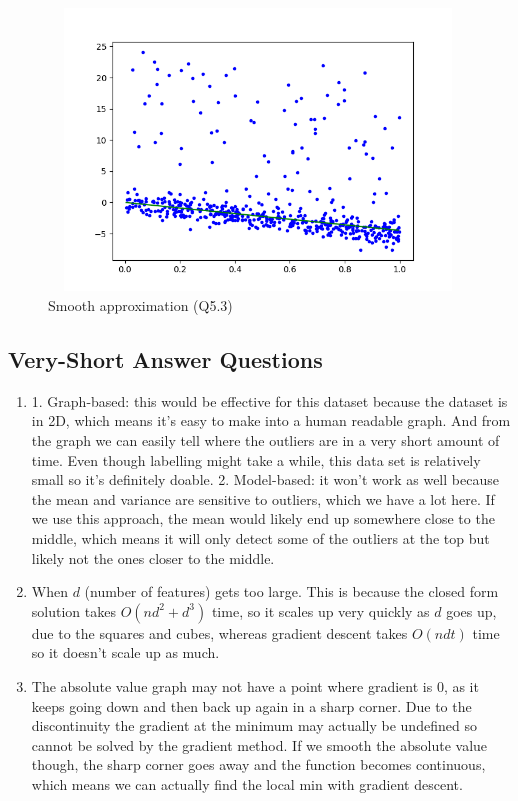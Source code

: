 \documentclass{article}
\def\enum#1{\begin{enumerate}#1\end{enumerate}}
\begin{document}
\begin{figure}[h!]
    \includegraphics[width=30em,height=7.5cm]{a2_q5_3.png}
    \caption{Smooth approximation (Q5.3)}
    \label{fig:q5_3}
  \end{figure}

\subsection{Very-Short Answer Questions}

\enum{
\item 1. Graph-based: this would be effective for this dataset because the dataset is in 2D, which means it's easy to make into a human readable graph. And from the graph we can easily tell where the outliers are in a very short amount of time. Even though labelling might take a while, this data set is relatively small so it's definitely doable. 2. Model-based: it won't work as well because the mean and variance are sensitive to outliers, which we have a lot here. If we use this approach, the mean would likely end up somewhere close to the middle, which means it will only detect some of the outliers at the top but likely not the ones closer to the middle.
\item When $d$ (number of features) gets too large. This is because the closed form solution takes $O(nd^2+d^3)$ time, so it scales up very quickly as $d$ goes up, due to the squares and cubes, whereas gradient descent takes $O(ndt)$ time so it doesn't scale up as much.
\item The absolute value graph may not have a point where gradient is 0, as it keeps going down and then back up again in a sharp corner. Due to the discontinuity the gradient at the minimum may actually be undefined so cannot be solved by the gradient method. If we smooth the absolute value though, the sharp corner goes away and the function becomes continuous, which means we can actually find the local min with gradient descent.
}
\end{document}
